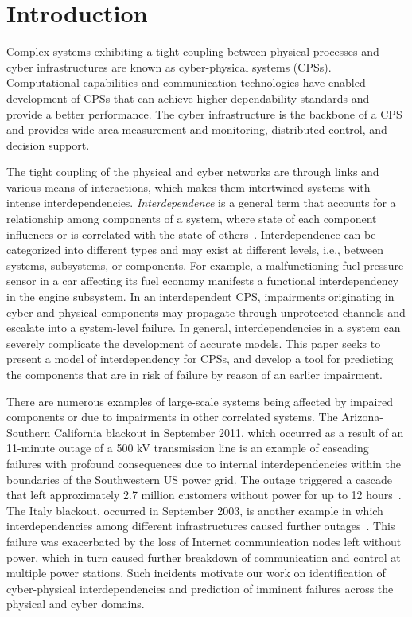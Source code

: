 \documentclass[12pt]{elsarticle}
\begin{document}
\section{Introduction}\label{sec:intro}
Complex systems exhibiting a tight coupling between physical processes and cyber infrastructures are known as cyber-physical systems (CPSs). Computational capabilities and communication technologies have enabled development of CPSs that can achieve higher dependability standards and provide a better performance. The cyber infrastructure is the backbone of a CPS and provides wide-area measurement and monitoring, distributed control, and decision support.

The tight coupling of the physical and cyber networks are through links and various means of interactions, which makes them intertwined systems with intense interdependencies. \emph{Interdependence} is a general term that accounts for a relationship among components of a system, where state of each component influences or is correlated with the state of others~\cite{RiP01}. Interdependence can be categorized into different types and may exist at different levels, i.e., between systems, subsystems, or components. For example, a malfunctioning fuel pressure sensor in a car affecting its fuel economy manifests a functional interdependency in the engine subsystem. In an interdependent CPS, impairments originating in cyber and physical components may propagate through unprotected channels and escalate into a system-level failure. In general, interdependencies in a system can severely complicate the development of accurate models. This paper seeks to present a model of interdependency for CPSs, and develop a tool for predicting the components that are in risk of failure by reason of an earlier impairment.

There are numerous examples of large-scale systems being affected by impaired components or due to impairments in other correlated systems. The Arizona-Southern California blackout in September 2011, which occurred as a result of an 11-minute outage of a 500 kV transmission line is an example of cascading failures with profound consequences due to internal interdependencies within the boundaries of the Southwestern US power grid. The outage triggered a cascade that left approximately 2.7 million customers without power for up to 12 hours~\cite{FERC12}. The Italy blackout, occurred in September 2003, is another example in which interdependencies among different infrastructures caused further outages~\cite{BeA04}. This failure was exacerbated by the loss of Internet communication nodes left without power, which in turn caused further breakdown of communication and control at multiple power stations. Such incidents motivate our work on identification of cyber-physical interdependencies and prediction of imminent failures across the physical and cyber domains.
\end{document}
